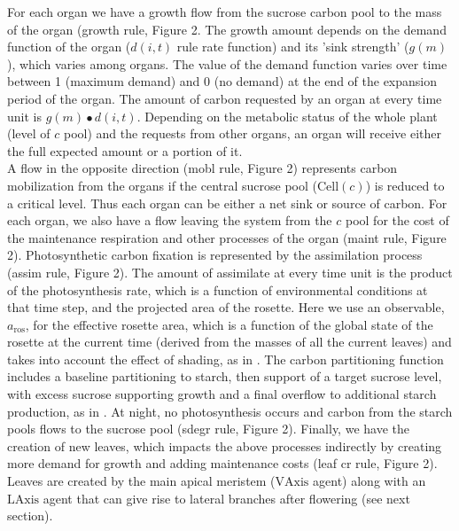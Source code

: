 \documentclass[phd]{infthesis}
\begin{document}
For each organ we have a growth flow from the sucrose carbon pool to the mass of
the organ (growth rule, ­­­Figure 2. The growth amount depends on the demand
function of the organ (\(d(i,t)\) rule rate function) and its 'sink strength'
(\(g(m)\)), which varies among organs. The value of the demand function varies
over time between 1 (maximum demand) and 0 (no demand) at the end of the
expansion period of the organ. The amount of carbon requested by an organ at
every time unit is \(g\left( m \right) \bullet d(i,t)\). Depending on the
metabolic status of the whole plant (level of \(c\) pool) and the requests from
other organs, an organ will receive either the full expected amount or a
portion of it.\\
A flow in the opposite direction (mobl rule, ­­­Figure 2) represents carbon
mobilization from the organs if the central sucrose pool (\(\text{Cell}(c)\)) is
reduced to a critical level. Thus each organ can be either a net sink or source
of carbon. For each organ, we also have a flow leaving the system from the \(c\)
pool for the cost of the maintenance respiration and other processes of the
organ (maint rule, ­­­Figure 2). Photosynthetic carbon fixation is represented
by the assimilation process (assim rule, ­­­Figure 2). The amount of assimilate
at every time unit is the product of the photosynthesis rate, which is a
function of environmental conditions at that time step, and the projected area
of the rosette. Here we use an observable, \(a_{\text{ros}}\), for the effective
rosette area, which is a function of the global state of the rosette at the
current time (derived from the masses of all the current leaves) and takes into
account the effect of shading, as in \citet{chew_multiscale_2014}. The carbon
partitioning function includes a baseline partitioning to starch, then support
of a target sucrose level, with excess sucrose supporting growth and a final
overflow to additional starch production, as in \citet{chew_multiscale_2014}. At
night, no photosynthesis occurs and carbon from the starch pools flows to the
sucrose pool (sdegr rule, ­­­Figure 2). Finally, we have the creation of new
leaves, which impacts the above processes indirectly by creating more demand for
growth and adding maintenance costs (leaf cr rule, ­­­Figure 2). Leaves are
created by the main apical meristem (\(\text{VAxis}\) agent) along with an
\(\text{LAxis}\) agent that can give rise to lateral branches after flowering
(see next section).
\end{document}
